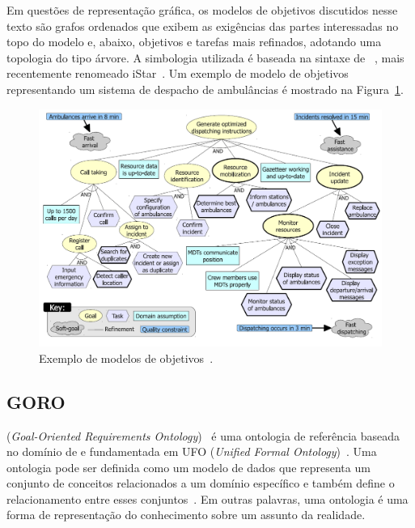 Em questões de representação gráfica, os modelos de objetivos discutidos nesse texto são grafos ordenados que exibem as exigências das partes interessadas no topo do modelo e, abaixo, objetivos e tarefas mais refinados, adotando uma topologia do tipo árvore. A simbologia utilizada é baseada na sintaxe de \istar~\cite{yu20111}, mais recentemente renomeado iStar~\cite{dalpiaz2016istar}. Um exemplo de modelo de objetivos representando um sistema de despacho de ambulâncias é mostrado na Figura~\ref{figura-acad-simples}.

\begin{figure}
	\centering
	\includegraphics[width=1\textwidth]{figuras/modelos/ACAD-Simples.png}
	\caption{Exemplo de modelos de objetivos~\cite{tesevitor}.}
	\label{figura-acad-simples}
\end{figure}

\subsection{GORO}
\label{sec-referencia-engenharia-objetivos-goro}
\goro (\textit{Goal-Oriented Requirements Ontology})~\cite{pedrogoro} é uma ontologia de referência baseada no domínio de \gore e fundamentada em UFO (\textit{Unified Formal Ontology})~\cite{guizzardi2005ontological}. Uma ontologia pode ser definida como um modelo de dados que representa um conjunto de conceitos relacionados a um domínio específico e também define o relacionamento entre esses conjuntos~\cite{gruber2009ontology}. Em outras palavras, uma ontologia é uma forma de representação do conhecimento sobre um assunto da realidade. 

